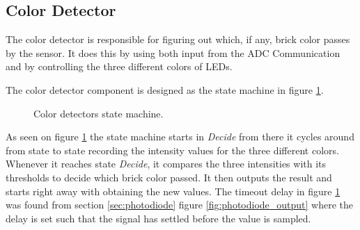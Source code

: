 
\subsection{Color Detector}
The color detector is responsible for figuring out which, if any, brick color passes by the sensor.
It does this by using both input from the ADC Communication and by controlling the three different colors of LEDs.

The color detector component is designed as the state machine in figure \ref{fig:colordetector_fsm}.



\begin{figure}[H]
\centering
{}

\caption{Color detectors state machine.}
\label{fig:colordetector_fsm}
\end{figure}

As seen on figure \ref{fig:colordetector_fsm} the state machine starts in \textit{Decide} from there it cycles around from state to state recording the intensity values for the three different colors.
Whenever it reaches state \textit{Decide}, it compares the three intensities with its thresholds to decide which brick color passed.
It then outputs the result and starts right away with obtaining the new values.
The timeout delay in figure \ref{fig:colordetector_fsm} was found from section \ref{sec:photodiode} figure \ref{fig:photodiode_output} where the delay is set such that the signal has settled before the value is sampled.

